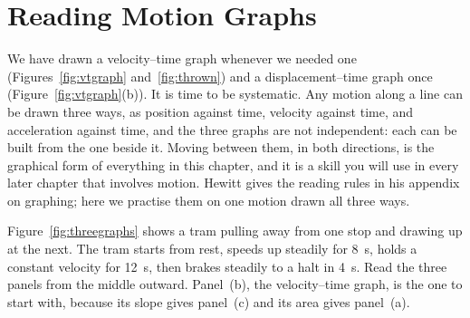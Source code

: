 \documentclass[11pt,twoside,openany]{book}
\begin{document}
\section{Reading Motion Graphs}
\label{sec:graphs}

We have drawn a velocity--time graph whenever we needed one (Figures~\ref{fig:vtgraph} and~\ref{fig:thrown}) and a displacement--time graph once (Figure~\ref{fig:vtgraph}(b)). It is time to be systematic. Any motion along a line can be drawn three ways, as position against time, velocity against time, and acceleration against time, and the three graphs are not independent: each can be built from the one beside it. Moving between them, in both directions, is the graphical form of everything in this chapter, and it is a skill you will use in every later chapter that involves motion. Hewitt gives the reading rules in his appendix on graphing; here we practise them on one motion drawn all three ways.

Figure~\ref{fig:threegraphs} shows a tram pulling away from one stop and drawing up at the next. The tram starts from rest, speeds up steadily for \SI{8}{\second}, holds a constant velocity for \SI{12}{\second}, then brakes steadily to a halt in \SI{4}{\second}. Read the three panels from the middle outward. Panel~(b), the velocity--time graph, is the one to start with, because its slope gives panel~(c) and its area gives panel~(a).
\end{document}
